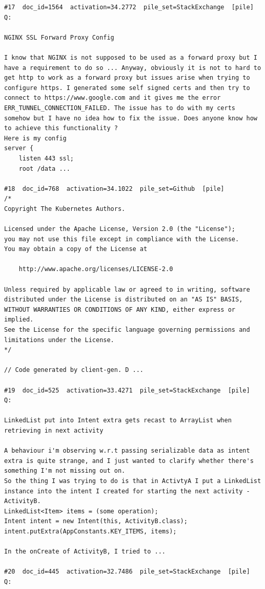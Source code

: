 \begin{verbatim}
#17  doc_id=1564  activation=34.2772  pile_set=StackExchange  [pile]
Q:

NGINX SSL Forward Proxy Config

I know that NGINX is not supposed to be used as a forward proxy but I have a requirement to do so ... Anyway, obviously it is not to hard to get http to work as a forward proxy but issues arise when trying to configure https. I generated some self signed certs and then try to connect to https://www.google.com and it gives me the error ERR_TUNNEL_CONNECTION_FAILED. The issue has to do with my certs somehow but I have no idea how to fix the issue. Does anyone know how to achieve this functionality ?
Here is my config
server {
    listen 443 ssl;
    root /data ...

#18  doc_id=768  activation=34.1022  pile_set=Github  [pile]
/*
Copyright The Kubernetes Authors.

Licensed under the Apache License, Version 2.0 (the "License");
you may not use this file except in compliance with the License.
You may obtain a copy of the License at

    http://www.apache.org/licenses/LICENSE-2.0

Unless required by applicable law or agreed to in writing, software
distributed under the License is distributed on an "AS IS" BASIS,
WITHOUT WARRANTIES OR CONDITIONS OF ANY KIND, either express or implied.
See the License for the specific language governing permissions and
limitations under the License.
*/

// Code generated by client-gen. D ...

#19  doc_id=525  activation=33.4271  pile_set=StackExchange  [pile]
Q:

LinkedList put into Intent extra gets recast to ArrayList when retrieving in next activity

A behaviour i'm observing w.r.t passing serializable data as intent extra is quite strange, and I just wanted to clarify whether there's something I'm not missing out on.
So the thing I was trying to do is that in ActivtyA I put a LinkedList instance into the intent I created for starting the next activity - ActivityB.
LinkedList<Item> items = (some operation);
Intent intent = new Intent(this, ActivityB.class);
intent.putExtra(AppConstants.KEY_ITEMS, items);

In the onCreate of ActivityB, I tried to ...

#20  doc_id=445  activation=32.7486  pile_set=StackExchange  [pile]
Q:


\end{verbatim}
